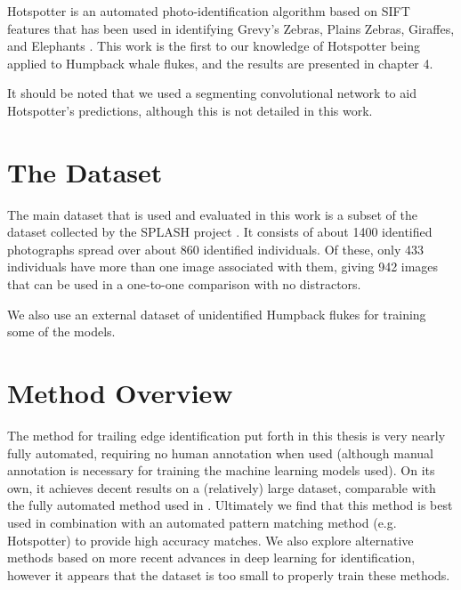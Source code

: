 Hotspotter \cite{crall_hotspotter_2013} is an automated photo-identification algorithm based on SIFT features that has been used in identifying Grevy's Zebras, Plains Zebras, Giraffes, and Elephants \cite{parham2015photographic}. This work is the first to our knowledge of Hotspotter being applied to Humpback whale flukes, and the results are presented in chapter 4.

It should be noted that we used a segmenting convolutional network to aid Hotspotter's predictions, although this is not detailed in this work.

\section{The Dataset}

The main dataset that is used and evaluated in this work is a subset of the dataset collected by the SPLASH project \cite{calambokidis2008splash}. 
It consists of about 1400 identified photographs spread over about 860 identified individuals.
Of these, only 433 individuals have more than one image associated with them, giving 942 images that can be used in a one-to-one comparison with no distractors.

We also use an external dataset of unidentified Humpback flukes for training some of the models.

\section{Method Overview}

The method for trailing edge identification put forth in this thesis is very nearly fully automated, requiring no human annotation when used (although manual annotation is necessary for training the machine learning models used).
On its own, it achieves decent results on a (relatively) large dataset, comparable with the fully automated method used in \cite{hughes2015automated}. 
Ultimately we find that this method is best used in combination with an automated pattern matching method (e.g. Hotspotter) to provide high accuracy matches.
We also explore alternative methods based on more recent advances in deep learning for identification, however it appears that the dataset is too small to properly train these methods.



